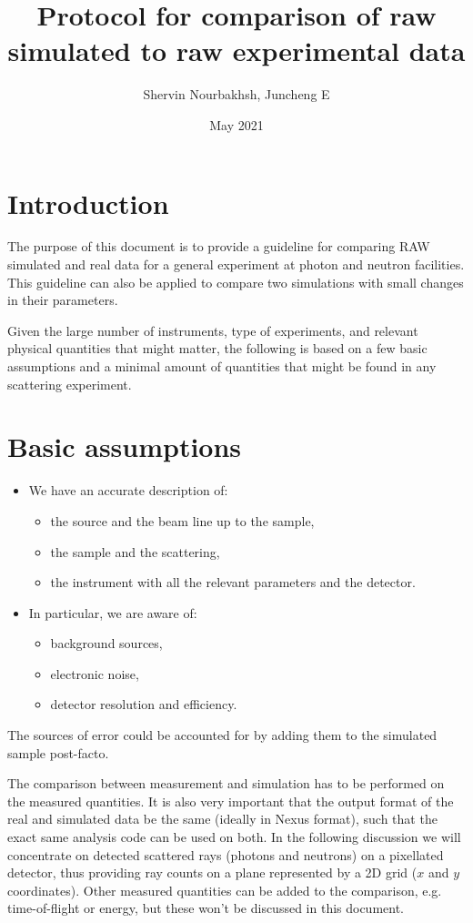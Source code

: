 \documentclass{article}
\title{Protocol for comparison of raw simulated to raw experimental data}
\author{Shervin Nourbakhsh, Juncheng E}
\date{May 2021}
\begin{document}
\maketitle
\thispagestyle{fancy}

\tableofcontents

\section{Introduction}
\label{sec:intro}

The purpose of this document is to provide a guideline for comparing RAW
simulated and real data for a general experiment at photon and neutron
facilities. This guideline can also be applied to compare two
simulations with small changes in their parameters.

Given the large number of instruments, type of experiments, and relevant
physical quantities that might matter, the following is based on a few
basic assumptions and a minimal amount of quantities that might  be
found in any scattering experiment.

\section{Basic assumptions}
\label{sec:assumptions}

\begin{itemize}
\item We have an accurate description of:
  \begin{itemize}
  \item the source and the beam line up to the sample,
  \item the sample and the scattering,
  \item the instrument with all the relevant parameters and the detector.
  \end{itemize}
\item In particular, we are aware of:
  \begin{itemize}
  \item background sources,
  \item electronic noise,
  \item detector resolution and efficiency.
  \end{itemize}
\end{itemize}
The sources of error could be accounted for by adding them to the simulated
sample post-facto.

The comparison between measurement and simulation has to be performed on the measured quantities. 
It is also very important that the output format of the real and simulated data be the same (ideally in Nexus format), such that the exact same analysis code can be used on both.
In the following discussion we will concentrate on detected scattered rays (photons and
neutrons) on a pixellated detector, thus providing ray counts on a
plane represented by a 2D grid ($x$ and $y$ coordinates). Other measured
quantities can be added to the comparison, e.g. time-of-flight or
energy, but these won't be discussed in this document.
\end{document}
